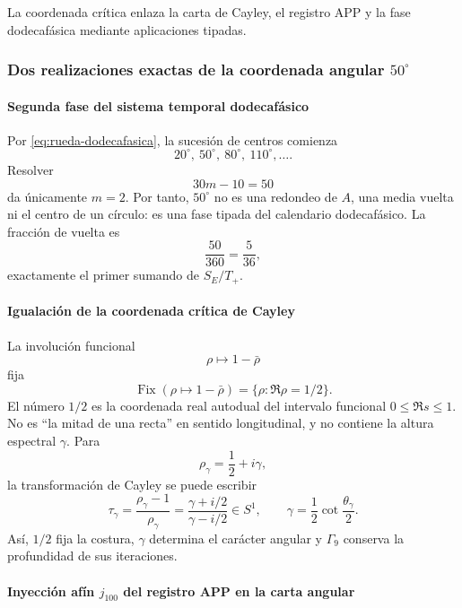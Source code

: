 \noindent La coordenada crítica enlaza la carta de Cayley, el registro APP y la fase dodecafásica mediante aplicaciones tipadas.\par\medskip

\subsubsection{Dos realizaciones exactas de la coordenada angular \(50^\circ\)}

\paragraph{Segunda fase del sistema temporal dodecafásico}

Por \eqref{eq:rueda-dodecafasica}, la sucesión de centros comienza
\[
20^\circ,\ 50^\circ,\ 80^\circ,\ 110^\circ,\ldots.
\]
Resolver
\[
30m-10=50
\]
da únicamente \(m=2\). Por tanto, \(50^\circ\) no es una redondeo de \(A\),
una media vuelta ni el centro de un círculo: es una fase tipada del calendario
dodecafásico. La fracción de vuelta es
\[
\frac{50}{360}=\frac5{36},
\]
exactamente el primer sumando de \(S_E/T_+\).

\paragraph{Igualación de la coordenada crítica de Cayley}

La involución funcional
\[
\rho\longmapsto1-\bar\rho
\]
fija
\[
\operatorname{Fix}(\rho\mapsto1-\bar\rho)
=\{\rho:\Re\rho=1/2\}.
\]
El número \(1/2\) es la coordenada real autodual del intervalo funcional
\(0\leq\Re s\leq1\). No es \enquote{la mitad de una recta} en sentido
longitudinal, y no contiene la altura espectral \(\gamma\). Para
\[
\rho_\gamma=\frac12+i\gamma,
\]
la transformación de Cayley se puede escribir
\begin{equation}
\tau_\gamma
=\frac{\rho_\gamma-1}{\rho_\gamma}
=\frac{\gamma+i/2}{\gamma-i/2}
\in S^1,
\qquad
\gamma=\frac12\cot\frac{\theta_\gamma}{2}.
\label{eq:cayley-critica}
\end{equation}
Así, \(1/2\) fija la costura, \(\gamma\) determina el carácter angular y
\(\Gamma_9\) conserva la profundidad de sus iteraciones.

\paragraph{Inyección afín \(j_{100}\) del registro APP en la carta angular}

